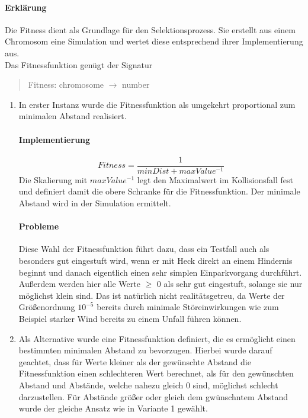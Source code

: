 \documentclass[12pt,a4paper]{scrartcl}
\begin{document}
\paragraph {Erklärung}
Die Fitness dient als Grundlage für den Selektionsprozess. Sie erstellt aus einem Chromosom eine Simulation und wertet diese entsprechend ihrer Implementierung aus.\\
Das Fitnessfunktion genügt der Signatur
\begin{quote}
	\textsf{Fitness: chromosome $\rightarrow$ number}
\end{quote}
\begin{enumerate}
	\item In erster Instanz wurde die Fitnessfunktion als umgekehrt proportional zum minimalen Abstand realisiert.
	\paragraph{Implementierung}
	\[Fitness = \frac{1}{minDist + maxValue^{-1}}\]
Die Skalierung mit $maxValue^{-1}$ legt den Maximalwert im Kollisionsfall fest und definiert damit die obere Schranke für die Fitnessfunktion. Der minimale Abstand wird in der Simulation ermittelt.
\paragraph{Probleme} Diese Wahl der Fitnessfunktion führt dazu, dass ein Testfall auch als besonders gut eingestuft wird, wenn er mit Heck direkt an einem Hindernis beginnt und danach eigentlich einen sehr simplen Einparkvorgang durchführt.\\
Außerdem werden hier alle Werte $\ge$ 0 als sehr gut eingestuft, solange sie nur möglichst klein sind. Das ist natürlich nicht realitätsgetreu, da Werte der Größenordnung $10^{-5}$ bereits durch minimale Störeinwirkungen wie zum Beispiel starker Wind bereits zu einem Unfall führen können.
	\item Als Alternative wurde eine Fitnessfunktion definiert, die es ermöglicht einen bestimmten minimalen Abstand zu bevorzugen. Hierbei wurde darauf geachtet, dass für Werte kleiner als der gewünschte Abstand die Fitnessfunktion einen \glqq schlechteren\grqq $ $ Wert berechnet, als für den gewünschten Abstand und Abstände, welche nahezu gleich 0 sind, möglichst schlecht darzustellen. Für Abstände größer oder gleich dem gwünschntem Abstand wurde der gleiche Ansatz wie in Variante 1 gewählt.\\

\end{enumerate}
\end{document}
